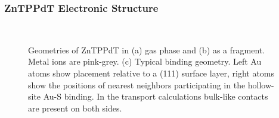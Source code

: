 \documentclass[aip,jcp,a4paper,reprint,floatfix,superscriptaddress]{revtex4-1}
\begin{document}
\subsubsection{ZnTPPdT Electronic Structure}\label{electronic_structure}


\begin{figure}
\hfill
{}\\
\caption{Geometries of ZnTPPdT in (a) gas phase and (b) as a fragment. Metal ions are pink-grey. (c) Typical binding geometry. Left Au atoms show placement relative to a (111) surface layer, right atoms show the positions of nearest neighbors participating in the hollow-site Au-S binding. In the transport calculations bulk-like contacts are present on both sides.}\label{fg:4geometries}
\end{figure}
\end{document}
